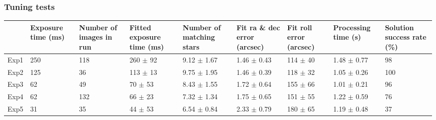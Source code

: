 \subsubsection{Tuning tests}

\renewcommand{\arraystretch}{1.5}
\def\labelitemi{--}
\begin{table}[!h]
\scriptsize
\caption[Star camera tests]{Star camera exposure time tests.}
\label{tab:starCameraTests}
\vspace{-0.5cm}
\begin{longtable}{l|P{1.5cm}P{1cm}P{1.5cm}P{1.5cm}P{1.5cm}P{1.5cm}P{1.5cm}P{1.5cm}}													
\toprule																							
{} 	&	  Exposure time (ms)	&	  Number of images in run 	&	  Fitted exposure time (ms)			&	  Number of matching stars 			&	  Fit ra \& dec error (arcsec) 			&	Fit roll error (arcsec)			&	  Processing time (s)			&	  Solution success rate (\%)	\\
\midrule																											
Exp1 	&	250	&	118	&	260	$\pm$	92	&	9.12	$\pm$	1.67	&	1.46	$\pm$	0.43	&	114	$\pm$	40	&	1.48	$\pm$	0.77	&	98	\\
Exp2 	&	125	&	36	&	113	$\pm$	13	&	9.75	$\pm$	1.95	&	1.46	$\pm$	0.39	&	118	$\pm$	32	&	1.05	$\pm$	0.26	&	100	\\
Exp3 	&	62	&	49	&	70	$\pm$	53	&	8.43	$\pm$	1.55	&	1.72	$\pm$	0.64	&	155	$\pm$	66	&	1.01	$\pm$	0.21	&	96	\\
Exp4 	&	62	&	132	&	66	$\pm$	23	&	7.32	$\pm$	1.34	&	1.75	$\pm$	0.65	&	151	$\pm$	55	&	1.22	$\pm$	0.59	&	76	\\
Exp5 	&	31	&	35	&	44	$\pm$	53	&	6.54	$\pm$	0.84	&	2.33	$\pm$	0.79	&	180	$\pm$	65	&	1.19	$\pm$	0.48	&	37	\\
\bottomrule
\end{longtable}																							
\end{table}																							

